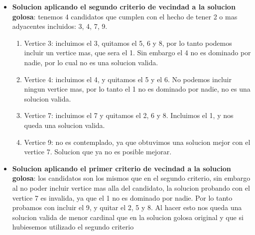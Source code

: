 \begin{itemize}
    \item \textbf{Solucion aplicando el segundo criterio de vecindad a la solucion golosa}: tenemos 4 candidatos que cumplen con el hecho de tener 2 o mas adyacentes incluidos: 3, 4, 7, 9.
    \begin{enumerate}
    	\item Vertice 3: incluimos el 3, quitamos el 5, 6 y 8, por lo tanto podemos incluir un vertice mas, que sera el 1. Sin embargo el 4 no es dominado por nadie, por lo cual no es una solucion valida.
        \item Vertice 4: incluimos el 4, y quitamos el 5 y el 6. No podemos incluir ningun vertice mas, por lo tanto el 1 no es dominado por nadie, no es una solucion valida.
        \item Vertice 7: incluimos el 7 y quitamos el 2, 6 y 8. Incluimos el 1, y nos queda una solucion valida.
        \item Vertice 9: no es contemplado, ya que obtuvimos una solucion mejor con el vertice 7. Solucion que ya no es posible mejorar.
	\end{enumerate}


    \item \textbf{Solucion aplicando el primer criterio de vecindad a la solucion golosa}: los candidatos son los mismos que en el segundo criterio, sin embargo al no poder incluir vertice mas alla del candidato, la solucion probando con el vertice 7 es invalida, ya que el 1 no es dominado por nadie. Por lo tanto probamos con incluir el 9, y quitar el 2, 5 y 8. Al hacer esto nos queda una solucion valida de menor cardinal que en la solucion golosa original y que si hubiesemos utilizado el segundo criterio




\end{itemize}
